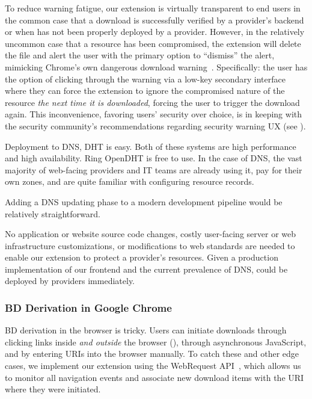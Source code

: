 To reduce warning fatigue, our extension is virtually transparent to end users
in the common case that a download is successfully verified by a provider's
backend or when \SYSTEM{} has not been properly deployed by a provider. However,
in the relatively uncommon case that a resource has been compromised, the
extension will delete the file and alert the user with the primary option to
``dismiss'' the alert, mimicking Chrome's own dangerous download
warning~\cite{ChromeClickThrough}. Specifically: the user has the option of
clicking through the warning via a low-key secondary interface where they can
force the extension to ignore the compromised nature of the resource \emph{the
next time it is downloaded}, forcing the user to trigger the download again.
This inconvenience, favoring users' security over choice, is in keeping with the
security community's recommendations regarding security warning UX (see
).

Deployment to DNS, DHT is easy. Both of these systems are high performance and
high availability. Ring OpenDHT is free to use. In the case of DNS, the vast
majority of web-facing providers and IT teams are already using it, pay for
their own zones, and are quite familiar with configuring resource records.

Adding a DNS updating phase to a modern development pipeline would be relatively
straightforward.

No application or website source code changes, costly user-facing server or web
infrastructure customizations, or modifications to web standards are needed to
enable our extension to protect a provider's resources. Given a production
implementation of our frontend and the current prevalence of DNS, \SYSTEM{}
could be deployed by providers immediately.

\subsubsection{BD Derivation in Google Chrome}

BD derivation in the browser is tricky. Users can initiate downloads through
clicking links inside \emph{and outside} the browser (), through asynchronous JavaScript, and by entering URIs into the
browser manually. To catch these and other edge cases, we implement our
extension using the WebRequest API~\cite{ExtensionAPI}, which allows us to
monitor all navigation events and associate new download items with the URI
where they were initiated.

